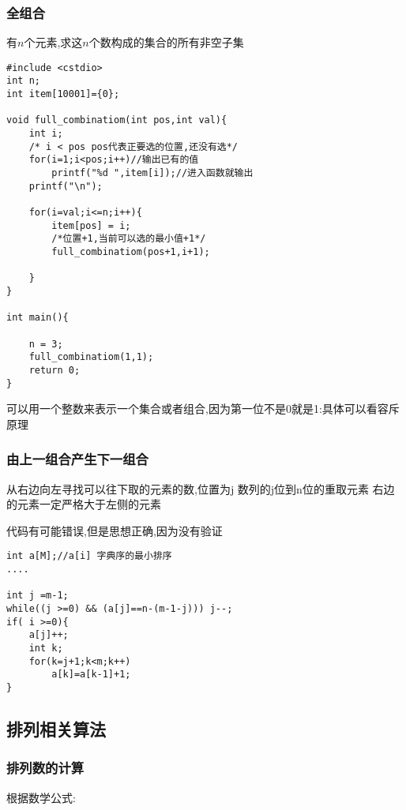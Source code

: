 \subsubsection{全组合}

有$n$个元素,求这$n$个数构成的集合的所有非空子集

\begin{lstlisting}
#include <cstdio>
int n;
int item[10001]={0};

void full_combinatiom(int pos,int val){
	int i;
	/* i < pos pos代表正要选的位置,还没有选*/
    for(i=1;i<pos;i++)//输出已有的值
        printf("%d ",item[i]);//进入函数就输出
    printf("\n");
	
    for(i=val;i<=n;i++){
        item[pos] = i;
		/*位置+1,当前可以选的最小值+1*/
        full_combinatiom(pos+1,i+1);
		
    }
}

int main(){
	
	n = 3;
	full_combinatiom(1,1);
	return 0;
}
\end{lstlisting}



可以用一个整数来表示一个集合或者组合,因为第一位不是0就是1:具体可以看容斥原理

\subsubsection{由上一组合产生下一组合}

从右边向左寻找可以往下取的元素的数,位置为j
数列的j位到n位的重取元素
右边的元素一定严格大于左侧的元素

代码有可能错误,但是思想正确,因为没有验证

\begin{lstlisting}
int a[M];//a[i] 字典序的最小排序
....

int j =m-1;
while((j >=0) && (a[j]==n-(m-1-j))) j--;
if( i >=0){
    a[j]++;
    int k;
    for(k=j+1;k<m;k++) 
        a[k]=a[k-1]+1;
}
\end{lstlisting}



\subsection{排列相关算法}

\subsubsection{排列数的计算}

根据数学公式:

